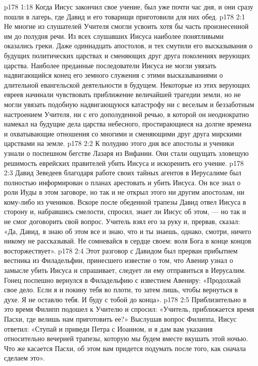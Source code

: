 \vs p178 1:18 \pc Когда Иисус закончил свое учение, был уже почти час дня, и они сразу пошли в лагерь, где Давид и его товарищи приготовили для них обед.
\vs p178 2:1 Не многие из слушателей Учителя смогли усвоить хотя бы часть произнесенной им до полудня речи. Из всех слушавших Иисуса наиболее понятливыми оказались греки. Даже одиннадцать апостолов, и тех смутили его высказывания о будущих политических царствах и сменяющих друг друга поколениях верующих царства. Наиболее преданные последователи Иисуса не могли увязать надвигающийся конец его земного служения с этими высказываниями о длительной евангельской деятельности в будущем. Некоторые из этих верующих евреев начинали чувствовать приближение величайшей трагедии земли, но не могли увязать подобную надвигающуюся катастрофу ни с веселым и беззаботным настроением Учителя, ни с его дополуденной речью, в которой он неоднократно намекал на будущие дела царства небесного, простирающиеся на долгие времена и охватывающие отношения со многими и сменяющими друг друга мирскими царствами на земле.
\vs p178 2:2 К полудню этого дня все апостолы и ученики узнали о поспешном бегстве Лазаря из Вифании. Они стали ощущать зловещую решимость еврейских правителей убить Иисуса и искоренить его учение.
\vs p178 2:3 Давид Зеведеев благодаря работе своих тайных агентов в Иерусалиме был полностью информирован о планах арестовать и убить Иисуса. Он все знал о роли Иуды в этом заговоре, но так и не открыл этого ни другим апостолам, ни кому\hyp{}либо из учеников. Вскоре после обеденной трапезы Давид отвел Иисуса в сторону и, набравшись смелости, спросил, знает ли Иисус об этом, --- но так и не смог договорить свой вопрос. Учитель взял его за руку и, прервав, сказал: «Да, Давид, я знаю об этом все и знаю, что и ты знаешь, однако, смотри, ничего никому не рассказывай. Не сомневайся в сердце своем: воля Бога в конце концов восторжествует».
\vs p178 2:4 Этот разговор с Давидом был прерван прибытием вестника из Филадельфии, принесшего известие о том, что Авенир узнал о замысле убить Иисуса и спрашивает, следует ли ему отправиться в Иерусалим. Гонец поспешно вернулся в Филадельфию с известием Авениру: «Продолжай свое дело. Если я и покину тебя во плоти, то затем лишь, чтобы вернуться в духе. Я не оставлю тебя. И буду с тобой до конца».
\vs p178 2:5 Приблизительно в это время Филипп подошел к Учителю и спросил: «Учитель, приближается время Пасхи, где велишь нам приготовить ее?» Выслушав вопрос Филиппа, Иисус ответил: «Ступай и приведи Петра с Иоанном, и я дам вам указания относительно вечерней трапезы, которую мы будем вместе вкушать этой ночью. Что же касается Пасхи, об этом вам придется подумать после того, как сначала сделаем это».
